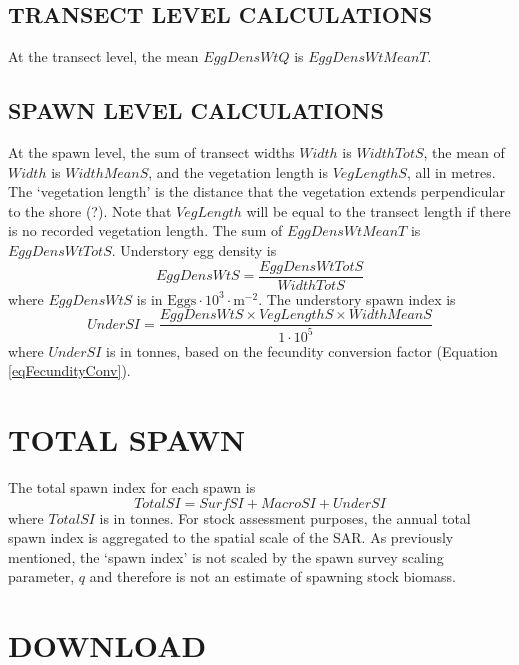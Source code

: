 \documentclass[12pt]{article}
\begin{document}
\subsection{TRANSECT LEVEL CALCULATIONS}

At the transect level, the mean $EggDensWtQ$ is $EggDensWtMeanT$.

\subsection{SPAWN LEVEL CALCULATIONS}

At the spawn level, the sum of transect widths $Width$ is $WidthTotS$, the mean of $Width$ is $WidthMeanS$, and the vegetation length is $VegLengthS$, all in metres.
The `vegetation length' is the distance that the vegetation extends perpendicular to the shore (?).
Note that $VegLength$ will be equal to the transect length if there is no recorded vegetation length.
The sum of $EggDensWtMeanT$ is $EggDensWtTotS$.
Understory egg density is 
\begin{equation}
EggDensWtS = \frac{EggDensWtTotS} {WidthTotS}
\label{eqEggDensityUnder}
\end{equation}
where $EggDensWtS$ is in $\text{Eggs} \cdot 10^{3} \cdot \text{m}^{-2}$.
The understory spawn index is
\begin{equation}
UnderSI = \frac{EggDensWtS \times VegLengthS \times WidthMeanS} {1 \cdot 10^{5}}
\label{eqBiomassUnder}
\end{equation}
where $UnderSI$ is in tonnes, based on the fecundity conversion factor (Equation \ref{eqFecundityConv}).

\section{TOTAL SPAWN}\label{secTotal}

The total spawn index for each spawn is
\begin{equation}
TotalSI = SurfSI + MacroSI + UnderSI
\label{eqTotalSI}
\end{equation}
where $TotalSI$ is in tonnes.
For stock assessment purposes, the annual total spawn index is aggregated to the spatial scale of the SAR.
As previously mentioned, the `spawn index' is not scaled by the spawn survey scaling parameter, $q$ \citeyearpar[CSAS][]{CSAS2015b} and therefore is not an estimate of spawning stock biomass.

\section{DOWNLOAD}\label{secDown}
\end{document}
